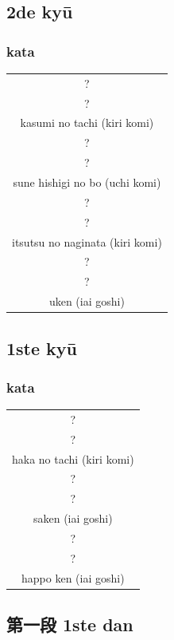 \documentclass[12pt]{scrartcl}
\begin{document}
\begin{CJK*}{UTF8}{min}
\subsection{2de ky\={u}}
\subsubsection{kata}
\begin{table}[H]
\begin{center}
\begin{tabular}{c}
?\\
?\\
kasumi no tachi (kiri komi)\\
\hline
?\\
?\\
sune hishigi no bo (uchi komi)\\
\hline
?\\
?\\
itsutsu no naginata (kiri komi)\\
\hline
?\\
?\\
uken (iai goshi)
\end{tabular}
\end{center}
\label{kyuu_2_katori_kata}
\end{table}

\subsection{1ste ky\={u}}
\subsubsection{kata}
\begin{table}[H]
\begin{center}
\begin{tabular}{c}
?\\
?\\
haka no tachi (kiri komi)\\
\hline
?\\
?\\
saken (iai goshi)\\
\hline
?\\
?\\
happo ken (iai goshi)
\end{tabular}
\end{center}
\label{kyuu_1_katori_kata}
\end{table}

\subsection{第一段 1ste dan}

\end{CJK*}
\end{document}

